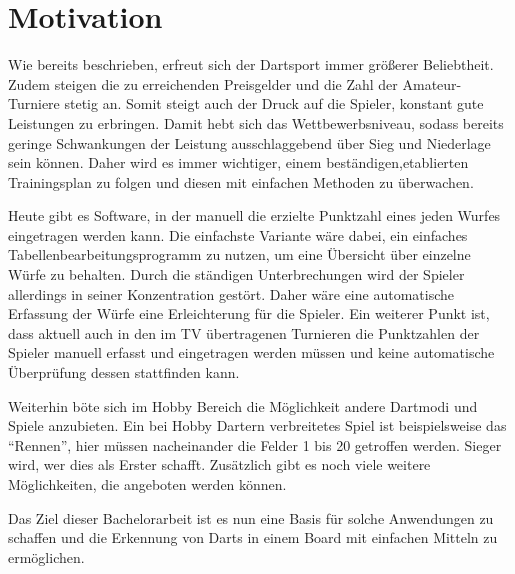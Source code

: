 \section*{Motivation}
\label{sec:motivation}
Wie bereits beschrieben, erfreut sich der Dartsport immer größerer Beliebtheit. Zudem steigen die zu erreichenden Preisgelder und die Zahl der Amateur-Turniere stetig an. Somit steigt auch der Druck auf die Spieler,  konstant gute Leistungen zu erbringen. Damit hebt sich das Wettbewerbsniveau, sodass bereits geringe Schwankungen der Leistung ausschlaggebend über Sieg und Niederlage sein können. Daher wird es immer wichtiger, einem beständigen,etablierten Trainingsplan zu folgen und diesen mit einfachen Methoden zu überwachen. 

Heute gibt es Software, in der manuell die erzielte Punktzahl eines jeden Wurfes eingetragen werden kann. Die einfachste Variante wäre dabei, ein einfaches Tabellenbearbeitungsprogramm zu nutzen, um eine Übersicht über einzelne Würfe zu behalten. 
Durch die ständigen Unterbrechungen wird der Spieler allerdings in seiner Konzentration gestört. 
Daher wäre eine automatische Erfassung der Würfe eine Erleichterung für die Spieler. Ein weiterer Punkt ist, dass aktuell auch in den im TV übertragenen Turnieren die Punktzahlen der Spieler manuell erfasst und eingetragen werden müssen und keine automatische Überprüfung dessen stattfinden kann. 

Weiterhin böte sich im Hobby Bereich die Möglichkeit andere Dartmodi und Spiele anzubieten. Ein bei Hobby Dartern verbreitetes Spiel ist beispielsweise das "`Rennen"', hier müssen nacheinander die Felder 1 bis 20 getroffen werden. Sieger wird, wer dies als Erster schafft. Zusätzlich gibt es noch viele weitere Möglichkeiten, die angeboten werden können.

Das Ziel dieser Bachelorarbeit ist es nun eine Basis für solche Anwendungen zu schaffen und die Erkennung von Darts in einem Board mit einfachen Mitteln zu ermöglichen.